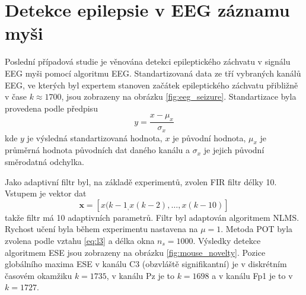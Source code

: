 \section{Detekce epilepsie v EEG záznamu myši}\label{chap:mdpi_eeg}
Poslední případová studie je věnována detekci epileptického záchvatu v signálu EEG myši pomocí algoritmu EEG. Standartizovaná data ze tří vybraných kanálů EEG, ve kterých byl expertem stanoven začátek epileptického záchvatu přibližně v čase $k \approx 1700$, jsou zobrazeny na obrázku \ref{fig:eeg_seizure}. Standartizace byla provedena podle předpisu
\begin{equation}
y=\frac{x-\mu_{x}}{\sigma_{x}}
\end{equation}
kde $y$ je výsledná standartizovaná hodnota, $x$ je původní hodnota, $\mu_x$ je průměrná hodnota původních dat daného kanálu a $\sigma_x$ je jejich původní směrodatná odchylka.
\par
Jako adaptivní filtr byl, na základě experimentů, zvolen FIR filtr délky 10. Vstupem je vektor dat
\begin{equation}
\textbf{x}=[x(k-1_,x(k-2),\dots,x(k-10)]
\end{equation}
takže filtr má 10 adaptivních parametrů. Filtr byl adaptován algoritmem NLMS. Rychost učení byla během experimentu nastavena na $\mu=1$. Metoda POT byla zvolena podle vztahu \ref{eq:l3} a délka okna $n_s=1000$. Výsledky detekce algoritmem ESE jsou zobrazeny na obrázku \ref{fig:mouse_novelty}. Pozice globálního maxima ESE v kanálu C3 (obzvláště signifikantní) je v diskrétním časovém okamžiku $k=1735$, v kanálu Pz je to  $k=1698$ a v kanálu Fp1 je to v $k=1727$. 

